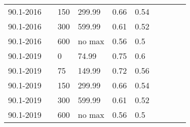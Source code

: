 \begin{table}
\begin{tabular}{|p{0.5in}|p{0.5in}|p{0.4in}|p{0.4in}|p{0.4in}|p{0.4in}|p{0.5in}|p{0.5in}|p{0.5in}|p{0.4in}|}
90.1-2016 &  & 150 & 299.99 & 0.66 & 0.54 &  &  &  &  \\ \cline{1-1} \cline{3-6}
90.1-2016 &  & 300 & 599.99 & 0.61 & 0.52 &  &  &  &  \\ \cline{1-1} \cline{3-6}
90.1-2016 &  & 600 & no max   & 0.56 & 0.5  &  &  &  &  \\ \cline{1-1} \cline{3-6}
90.1-2019 &  & 0   & 74.99  & 0.75 & 0.6  &  &  &  &  \\ \cline{1-1} \cline{3-6}
90.1-2019 &  & 75  & 149.99 & 0.72 & 0.56 &  &  &  &  \\ \cline{1-1} \cline{3-6}
90.1-2019 &  & 150 & 299.99 & 0.66 & 0.54 &  &  &  &  \\ \cline{1-1} \cline{3-6}
90.1-2019 &  & 300 & 599.99 & 0.61 & 0.52 &  &  &  &  \\ \cline{1-1} \cline{3-6}
90.1-2019 &  & 600 & no max   & 0.56 & 0.5  &  &  &  &  \\ \hline


\end{tabular}
\end{table}